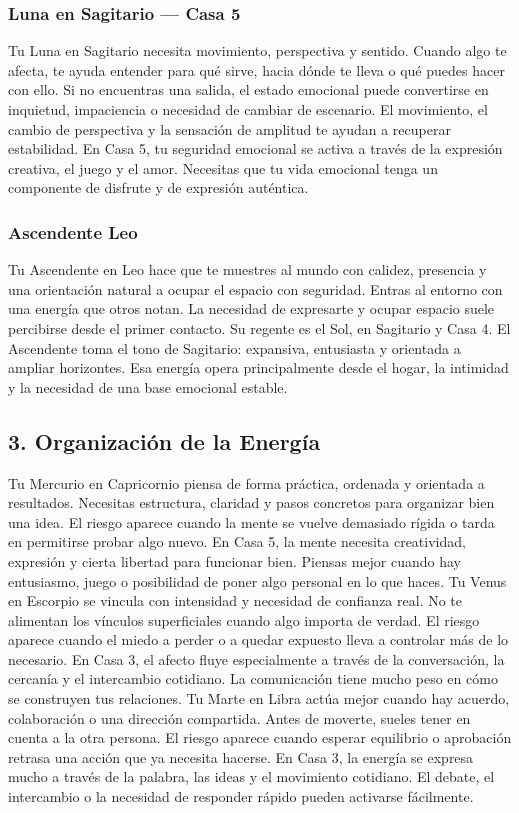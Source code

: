 \documentclass[11pt,a4paper]{article}
\begin{document}
\subsubsection*{Luna en Sagitario — Casa 5}
Tu Luna en Sagitario necesita movimiento, perspectiva y sentido. Cuando algo te afecta, te ayuda entender para qué sirve, hacia dónde te lleva o qué puedes hacer con ello. Si no encuentras una salida, el estado emocional puede convertirse en inquietud, impaciencia o necesidad de cambiar de escenario. El movimiento, el cambio de perspectiva y la sensación de amplitud te ayudan a recuperar estabilidad. En Casa 5, tu seguridad emocional se activa a través de la expresión creativa, el juego y el amor. Necesitas que tu vida emocional tenga un componente de disfrute y de expresión auténtica.

\subsubsection*{Ascendente Leo}
Tu Ascendente en Leo hace que te muestres al mundo con calidez, presencia y una orientación natural a ocupar el espacio con seguridad. Entras al entorno con una energía que otros notan. La necesidad de expresarte y ocupar espacio suele percibirse desde el primer contacto. Su regente es el Sol, en Sagitario y Casa 4. El Ascendente toma el tono de Sagitario: expansiva, entusiasta y orientada a ampliar horizontes. Esa energía opera principalmente desde el hogar, la intimidad y la necesidad de una base emocional estable.


\subsection{3. Organización de la Energía}

Tu Mercurio en Capricornio piensa de forma práctica, ordenada y orientada a resultados. Necesitas estructura, claridad y pasos concretos para organizar bien una idea. El riesgo aparece cuando la mente se vuelve demasiado rígida o tarda en permitirse probar algo nuevo. En Casa 5, la mente necesita creatividad, expresión y cierta libertad para funcionar bien. Piensas mejor cuando hay entusiasmo, juego o posibilidad de poner algo personal en lo que haces. Tu Venus en Escorpio se vincula con intensidad y necesidad de confianza real. No te alimentan los vínculos superficiales cuando algo importa de verdad. El riesgo aparece cuando el miedo a perder o a quedar expuesto lleva a controlar más de lo necesario. En Casa 3, el afecto fluye especialmente a través de la conversación, la cercanía y el intercambio cotidiano. La comunicación tiene mucho peso en cómo se construyen tus relaciones. Tu Marte en Libra actúa mejor cuando hay acuerdo, colaboración o una dirección compartida. Antes de moverte, sueles tener en cuenta a la otra persona. El riesgo aparece cuando esperar equilibrio o aprobación retrasa una acción que ya necesita hacerse. En Casa 3, la energía se expresa mucho a través de la palabra, las ideas y el movimiento cotidiano. El debate, el intercambio o la necesidad de responder rápido pueden activarse fácilmente.
\end{document}
